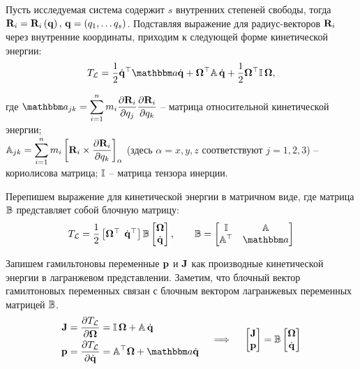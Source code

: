 Пусть исследуемая система содержит $s$ внутренних степеней свободы, тогда $\mathbf{R}_i = \mathbf{R}_i \left( \mathbf{q} \right), \, \mathbf{q} = \left( q_1, \dots q_s \right)$. Подставляя выражение для радиус-векторов $\mathbf{R}_i$ через внутренние координаты, приходим к следующей форме кинетической энергии:
\vverh
\begin{gather}
	T_\mL = \frac{1}{2} \dot{\mf{q}}^\top \bba \dot{\mf{q}} + \mf{\Omega}^\top \bbA \, \dot{\mf{q}} + \frac{1}{2} \mf{\Omega}^\top \bbI \, \mf{\Omega}, \notag
\end{gather}

где $\bba_{jk} = \displaystyle \sum_{i=1}^{n} m_i \displaystyle \frac{\partial \mf{R}_i}{\partial q_j} \frac{\partial \mf{R}_i}{\partial q_k}$ -- матрица относительной кинетической энергии; \\ 
$\mathbb{A}_{jk} = \displaystyle \sum_{i=1}^{n} m_i \left[ \mathbf{R}_i \times \displaystyle \frac{\partial \mathbf{R}_i}{\partial q_k} \right]_\alpha$ (здесь $\alpha = x, y, z$ соответствуют $j = 1, 2, 3$) -- кориолисова матрица; $\mathbb{I}$ -- матрица тензора инерции. \par
Перепишем выражение для кинетической энергии в матричном виде, где матрица $\mathbb{B}$ представляет собой блочную матрицу:
\vverh
\begin{gather}
	T_\mL = \frac{1}{2}
	\begin{bmatrix}
		\mf{\Omega}^\top & \hspace*{-2mm} \dot{\mf{q}}^\top
	\end{bmatrix}
	\bbB
	\begin{bmatrix}
		\mf{\Omega} \\ 
		\dot{\mf{q}}
	\end{bmatrix},
	\quad \quad
	\bbB = 
	\begin{bmatrix}
		\bbI & \bbA \\
		\bbA^\top & \bba
	\end{bmatrix}
	\notag
\end{gather}

Запишем гамильтоновы переменные $\mathbf{p}$ и $\mathbf{J}$ как производные кинетической энергии в лагранжевом представлении. Заметим, что блочный вектор гамилтоновых переменных связан с блочным вектором лагранжевых переменных матрицей $\mathbb{B}$.
\vverh
\begin{gather}
	\begin{aligned}
		\mf{J} &= \frac{\partial T_\mL}{\partial \mf{\Omega}} = \bbI \, \mf{\Omega} + \bbA \, \dot{\mf{q}} \\
		\mf{p} &= \frac{\partial T_\mL}{\partial \dot{\mf{q}}} = \bbA^\top \mf{\Omega} + \bba \dot{\mf{q}}
	\end{aligned}
	\quad \implies \quad
	\begin{bmatrix}
		\mf{J} \\
		\mf{p}
	\end{bmatrix} = 
	\bbB
	\begin{bmatrix}
		\mf{\Omega} \\
		\dot{\mf{q}}
	\end{bmatrix} \notag
\end{gather}

